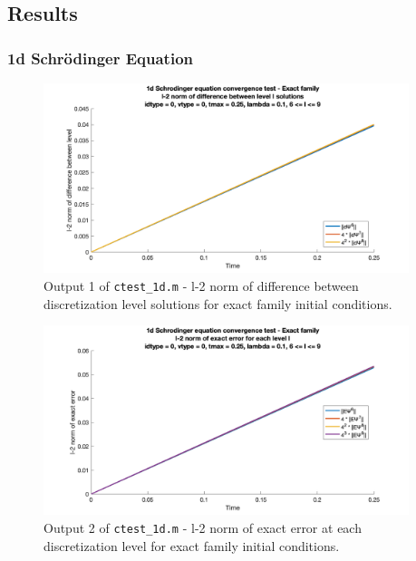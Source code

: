 \documentclass[10pt]{article}
\def\code#1{\texttt{#1}} %
\begin{document}
\subsection*{Results}

\subsubsection*{1d Schrödinger Equation}


\begin{figure}[H]
\centering
\includegraphics[width=0.95\textwidth]{problem1/ctest_1d-1.png}
\caption{Output 1 of \code{ctest\_1d.m} - 
l-2 norm of difference between discretization level solutions for exact family initial conditions.}
\end{figure}

\begin{figure}[H]
\centering
\includegraphics[width=0.95\textwidth]{problem1/ctest_1d-2.png}
\caption{Output 2 of \code{ctest\_1d.m} - 
l-2 norm of exact error at each discretization level for exact family initial conditions.}
\end{figure}
\end{document}
